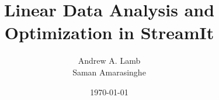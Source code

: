 \documentclass{article}
\title{Linear Data Analysis and Optimization in StreamIt}
\author{Andrew A. Lamb \\ Saman Amarasinghe}
\date{\today}
\begin{document}
\maketitle
\clearpage









\begin{small}
\begin{singlespace}


\end{singlespace}
\end{small}
\end{document}
